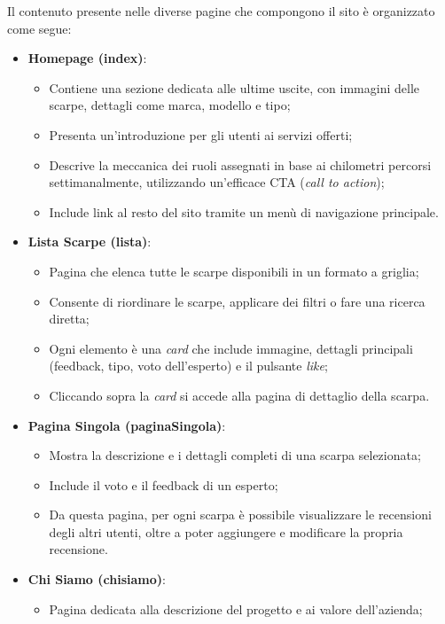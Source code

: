 \documentclass[a4paper, 12pt]{article}
\begin{document}
\begin{justify}
Il contenuto presente nelle diverse pagine che compongono il sito è organizzato come segue:
\begin{itemize}
    \item \textbf{Homepage (index)}:
        \begin{itemize}
            \item Contiene una sezione dedicata alle ultime uscite, con immagini delle scarpe, dettagli come marca, modello e tipo;
            \item Presenta un'introduzione per gli utenti ai servizi offerti;
            \item Descrive la meccanica dei ruoli assegnati in base ai chilometri percorsi settimanalmente, utilizzando un'efficace CTA (\textit{call to action});
            \item Include link al resto del sito tramite un menù di navigazione principale.
        \end{itemize}
    \item \textbf{Lista Scarpe (lista)}:
        \begin{itemize}
            \item Pagina che elenca tutte le scarpe disponibili in un formato a griglia;
            \item Consente di riordinare le scarpe, applicare dei filtri o fare una ricerca diretta;
            \item Ogni elemento è una \textit{card} che include immagine, dettagli principali (feedback, tipo, voto dell'esperto) e il pulsante \textit{like};
            \item Cliccando sopra la \textit{card} si accede alla pagina di dettaglio della scarpa.
        \end{itemize}
    \item \textbf{Pagina Singola (paginaSingola)}:
        \begin{itemize}
            \item Mostra la descrizione e i dettagli completi di una scarpa selezionata;
            \item Include il voto e il feedback di un esperto;
            \item Da questa pagina, per ogni scarpa è possibile visualizzare le recensioni degli altri utenti, oltre a poter aggiungere e modificare la propria recensione.
        \end{itemize}
    \item \textbf{Chi Siamo (chisiamo)}:
        \begin{itemize}
            \item Pagina dedicata alla descrizione del progetto e ai valore dell'azienda;

\end{itemize}
\end{itemize}
\end{justify}
\end{document}
